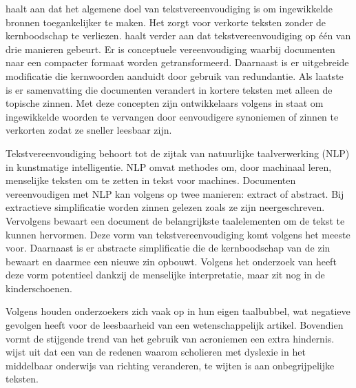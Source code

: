 \textcite{Shardlow2014} haalt aan dat het algemene doel van tekstvereenvoudiging is om ingewikkelde bronnen toegankelijker te maken. Het zorgt voor verkorte teksten zonder de kernboodschap te verliezen. \textcite{Siddharthan2014} haalt verder aan dat tekstvereenvoudiging op één van drie manieren gebeurt. Er is conceptuele vereenvoudiging waarbij documenten naar een compacter formaat worden getransformeerd. Daarnaast is er uitgebreide modificatie die kernwoorden aanduidt door gebruik van redundantie. Als laatste is er samenvatting die documenten verandert in kortere teksten met alleen de topische zinnen. Met deze concepten zijn ontwikkelaars volgens \textcite{Siddharthan2014} in staat om ingewikkelde woorden te vervangen door eenvoudigere synoniemen of zinnen te verkorten zodat ze sneller leesbaar zijn.

Tekstvereenvoudiging behoort tot de zijtak van natuurlijke taalverwerking (NLP) in kunstmatige intelligentie. NLP omvat methodes om, door machinaal leren, menselijke teksten om te zetten in tekst voor machines. Documenten vereenvoudigen met NLP kan volgens \textcite{Chowdhary2020} op twee manieren: extract of abstract. Bij extractieve simplificatie worden zinnen gelezen zoals ze zijn neergeschreven. Vervolgens bewaart een document de belangrijkste taalelementen om de tekst te kunnen hervormen. Deze vorm van tekstvereenvoudiging komt volgens \autocite{Sciforce2020} het meeste voor. Daarnaast is er abstracte simplificatie die de kernboodschap van de zin bewaart en daarmee een nieuwe zin opbouwt. Volgens het onderzoek van \textcite{Chowdhary2020} heeft deze vorm potentieel dankzij de menselijke interpretatie, maar zit nog in de kinderschoenen.


Volgens \textcite{PlavenSigray2017} houden onderzoekers zich vaak op in hun eigen taalbubbel, wat negatieve gevolgen heeft voor de leesbaarheid van een wetenschappelijk artikel. Bovendien vormt de stijgende trend van het gebruik van acroniemen \textcite{Barnett2020} een extra hindernis. \textcite{Donato2022} wijst uit dat een van de redenen waarom scholieren met dyslexie in het middelbaar onderwijs van richting veranderen, te wijten is aan onbegrijpelijke teksten.

